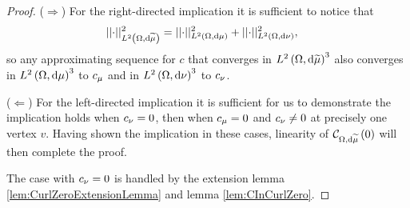 \begin{proof}
	($\Rightarrow$) For the right-directed implication it is sufficient to notice that 
	\begin{align*}
		\lvert\lvert \cdot \rvert\rvert_{L^{2}\left( \Omega,\mathrm{d} \widetilde{\mu} \right)}^2 &= \lvert\lvert \cdot \rvert\rvert_{L^{2}\left( \Omega,\mathrm{d} \mu \right)}^2 + \lvert\lvert \cdot \rvert\rvert_{L^{2}\left( \Omega,\mathrm{d} \nu \right)}^2,
	\end{align*}
	so any approximating sequence for $c$ that converges in $L^{2}\left( \Omega,\mathrm{d} \widetilde{\mu} \right)^3$ also converges in $L^{2}\left( \Omega,\mathrm{d} \mu \right)^3$ to $c_{\mu}$ and in $L^{2}\left( \Omega,\mathrm{d} \nu \right)^3$ to $c_{\nu}$.
	
	($\Leftarrow$) For the left-directed implication it is sufficient for us to demonstrate the implication holds when $c_{\nu}=0$, then when $c_{\mu}=0$ and $c_{\nu}\neq0$ at precisely one vertex $v$.
	Having shown the implication in these cases, linearity of $\mathcal{C}_{ \Omega, \mathrm{d}\widetilde{\mu}}\left( 0 \right)$ will then complete the proof.
	
	The case with $c_{\nu}=0$ is handled by the extension lemma \ref{lem:CurlZeroExtensionLemma} and lemma \ref{lem:CInCurlZero}.
	

\end{proof}
